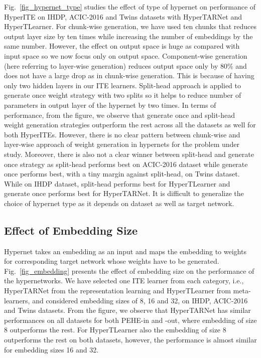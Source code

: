\documentclass{article}
\begin{document}
Fig.~\ref{fig_hypernet_type} studies the effect of type of hypernet on performance of HyperITE on IHDP, ACIC-2016 and Twins datasets with HyperTARNet and HyperTLearner. For chunk-wise generation, we have used ten chunks that reduces output layer size by ten times while increasing the number of embeddings by the same number. However, the effect on output space is huge as compared with input space so we now focus only on output space. Component-wise generation (here referring to layer-wise generation) reduces output space only by 80\% and does not have a large drop as in chunk-wise generation. This is because of having only two hidden layers in our ITE learners. Split-head approach is applied to generate once weight strategy with two splits so it helps to reduce number of parameters in output layer of the hypernet by two times. In terms of performance, from the figure, we observe that generate once and split-head weight generation strategies outperform the rest across all the datasets as well for both HyperITEs. However, there is no clear pattern between chunk-wise and layer-wise approach of weight generation in hypernets for the problem under study. Moreover, there is also not a clear winner between split-head and generate once strategy as split-head performs best on ACIC-2016 dataset while generate once performs best, with a tiny margin against split-head, on Twins dataset. While on IHDP dataset, split-head performs best for HyperTLearner and generate once performs best for HyperTARNet. It is difficult to generalize the choice of hypernet type as it depends on dataset as well as target network.


\subsection{Effect of Embedding Size}
\label{subapp_embedding}
Hypernet takes an embedding as an input and maps the embedding to weights for corresponding target network whose weights have to be generated. Fig.~\ref{fig_embedding} presents the effect of embedding size on the performance of the hypernetworks. We have selected one ITE learner from each category, i.e., HyperTARNet from the representation learning and HyperTLearner from meta-learners, and considered embedding sizes of 8, 16 and 32, on IHDP, ACIC-2016 and Twins datasets. From the figure, we observe that HyperTARNet has similar performances on all datasets for both PEHE-in and -out, where embedding of size 8 outperforms the rest. For HyperTLearner also the embedding of size 8 outperforms the rest on both datasets, however, the performance is almost similar for embedding sizes 16 and 32.
\end{document}

